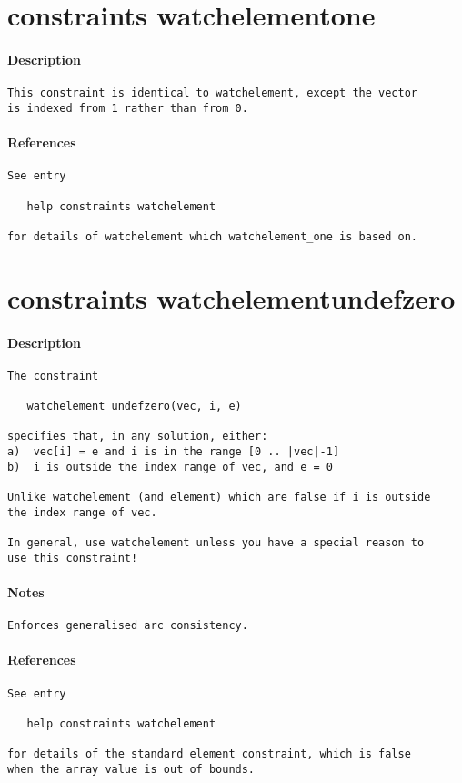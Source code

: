 \section{constraints watchelement\textunderscore one}
\paragraph{Description}
{\footnotesize
\begin{verbatim}
This constraint is identical to watchelement, except the vector
is indexed from 1 rather than from 0.
\end{verbatim}
}
\paragraph{References}
{\footnotesize
\begin{verbatim}
See entry

   help constraints watchelement

for details of watchelement which watchelement_one is based on.
\end{verbatim}
}
\section{constraints watchelement\textunderscore undefzero}
\paragraph{Description}
{\footnotesize
\begin{verbatim}
The constraint

   watchelement_undefzero(vec, i, e)

specifies that, in any solution, either:
a)  vec[i] = e and i is in the range [0 .. |vec|-1]
b)  i is outside the index range of vec, and e = 0

Unlike watchelement (and element) which are false if i is outside
the index range of vec.

In general, use watchelement unless you have a special reason to
use this constraint!
\end{verbatim}
}
\paragraph{Notes}
{\footnotesize
\begin{verbatim}
Enforces generalised arc consistency.
\end{verbatim}
}
\paragraph{References}
{\footnotesize
\begin{verbatim}
See entry

   help constraints watchelement

for details of the standard element constraint, which is false
when the array value is out of bounds.
\end{verbatim}
}

